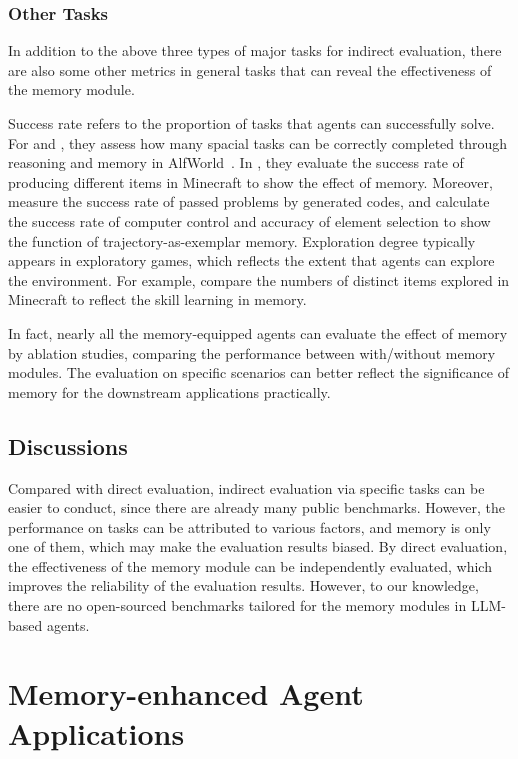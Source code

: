 \documentclass{article}
\theoremstyle{definition}
\theoremstyle{theorem}
\theoremstyle{proof}
\theoremstyle{remark}
\begin{document}
	\subsubsection{Other Tasks}
	In addition to the above three types of major tasks for indirect evaluation, there are also some other metrics in general tasks that can reveal the effectiveness of the memory module.
	
	Success rate refers to the proportion of tasks that agents can successfully solve. For \citet{react,reflexion} and \citet{expel}, they assess how many spacial tasks can be correctly completed through reasoning and memory in AlfWorld~\cite{alfworld}. In \citet{gitm}, they evaluate the success rate of producing different items in Minecraft to show the effect of memory. Moreover, \citet{reflexion} measure the success rate of passed problems by generated codes, and \citet{synapse} calculate the success rate of computer control and accuracy of element selection to show the function of trajectory-as-exemplar memory.
	Exploration degree typically appears in exploratory games, which reflects the extent that agents can explore the environment. For example, \citet{voyager} compare the numbers of distinct items explored in Minecraft to reflect the skill learning in memory.
	
	In fact, nearly all the memory-equipped agents can evaluate the effect of memory by ablation studies, comparing the performance between with/without memory modules. The evaluation on specific scenarios can better reflect the significance of memory for the downstream applications practically.
	
	\subsection{Discussions}
	Compared with direct evaluation, indirect evaluation via specific tasks can be easier to conduct, since there are already many public benchmarks. However, the performance on tasks can be attributed to various factors, and memory is only one of them, which may make the evaluation results biased.
	By direct evaluation, the effectiveness of the memory module can be independently evaluated, which improves the reliability of the evaluation results. However, to our knowledge, there are no open-sourced benchmarks tailored for the memory modules in LLM-based agents.
	
	\section{Memory-enhanced Agent Applications}
	\label{sec:application}
	
\end{document}
